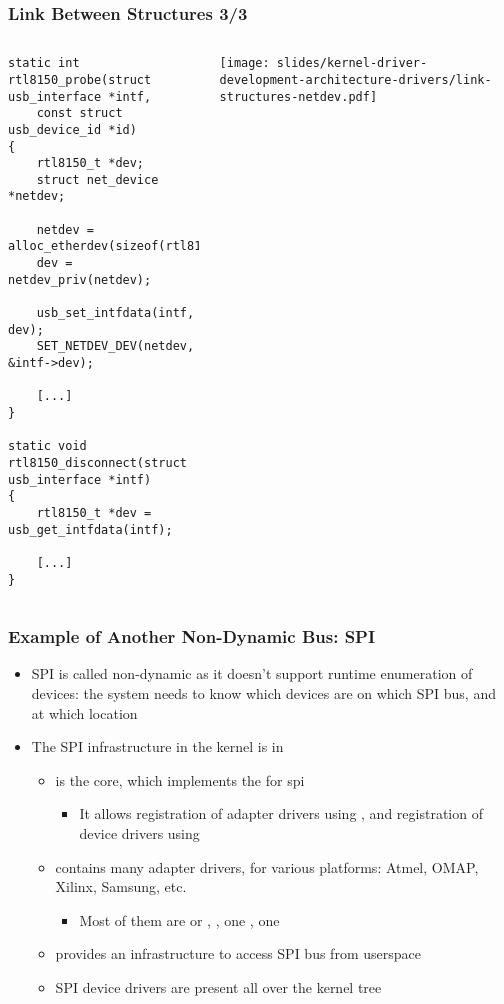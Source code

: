 \begin{frame}[fragile]
  \frametitle{Link Between Structures 3/3}
  \begin{columns}
    \begin{verbatim}
static int rtl8150_probe(struct usb_interface *intf,
    const struct usb_device_id *id)
{
    rtl8150_t *dev;
    struct net_device *netdev;

    netdev = alloc_etherdev(sizeof(rtl8150_t));
    dev = netdev_priv(netdev);

    usb_set_intfdata(intf, dev);
    SET_NETDEV_DEV(netdev, &intf->dev);

    [...]
}

static void rtl8150_disconnect(struct usb_interface *intf)
{
    rtl8150_t *dev = usb_get_intfdata(intf);

    [...]
}
    \end{verbatim}
    \begin{center}
      \texttt{[image: slides/kernel-driver-development-architecture-drivers/link-structures-netdev.pdf]}
    \end{center}
  \end{columns}
\end{frame}

\begin{frame}
  \frametitle{Example of Another Non-Dynamic Bus: SPI}
  \begin{itemize}
  \item SPI is called non-dynamic as it doesn't support runtime
    enumeration of devices: the system needs to know which devices are
    on which SPI bus, and at which location
  \item The SPI infrastructure in the kernel is in 
    \begin{itemize}
    \item {} is the core, which implements the
       for spi
      \begin{itemize}
      \item It allows registration of adapter drivers using
        , and registration of device
        drivers using 
      \end{itemize}
    \item {} contains many adapter drivers, for
      various platforms: Atmel, OMAP, Xilinx, Samsung, etc.
      \begin{itemize}
      \item Most of them are  or
        , , one
        , one 
      \end{itemize}
    \item {} provides an infrastructure to
      access SPI bus from userspace
    \item SPI device drivers are present all over the kernel tree
    \end{itemize}
  \end{itemize}
\end{frame}

